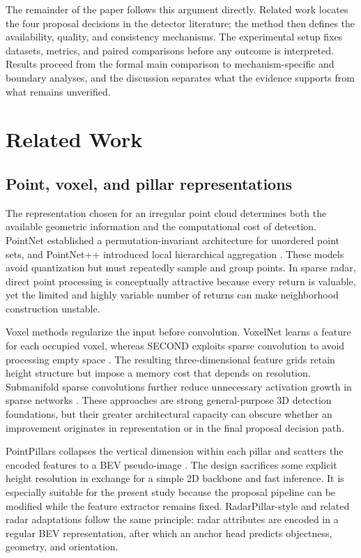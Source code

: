 \documentclass[final,5p,times]{elsarticle}
\begin{document}
The remainder of the paper follows this argument directly. Related work
locates the four proposal decisions in the detector literature; the method
then defines the availability, quality, and consistency mechanisms. The
experimental setup fixes datasets, metrics, and paired comparisons before any
outcome is interpreted. Results proceed from the formal main comparison to
mechanism-specific and boundary analyses, and the discussion separates what
the evidence supports from what remains unverified.

\section{Related Work}

\subsection{Point, voxel, and pillar representations}

The representation chosen for an irregular point cloud determines both the
available geometric information and the computational cost of detection.
PointNet established a permutation-invariant architecture for unordered point
sets, and PointNet++ introduced local hierarchical aggregation
\cite{qi2017pointnet,qi2017pointnetpp}. These models avoid quantization but
must repeatedly sample and group points. In sparse radar, direct point
processing is conceptually attractive because every return is valuable, yet
the limited and highly variable number of returns can make neighborhood
construction unstable.

Voxel methods regularize the input before convolution. VoxelNet learns a
feature for each occupied voxel, whereas SECOND exploits sparse convolution to
avoid processing empty space \cite{zhou2018voxelnet,yan2018second}. The
resulting three-dimensional feature grids retain height structure but impose a
memory cost that depends on resolution. Submanifold sparse convolutions further
reduce unnecessary activation growth in sparse networks
\cite{graham2018submanifold}. These approaches are strong general-purpose 3D
detection foundations, but their greater architectural capacity can obscure
whether an improvement originates in representation or in the final proposal
decision path.

PointPillars collapses the vertical dimension within each pillar and scatters
the encoded features to a BEV pseudo-image \cite{lang2019pointpillars}. The
design sacrifices some explicit height resolution in exchange for a simple 2D
backbone and fast inference. It is especially suitable for the present study
because the proposal pipeline can be modified while the feature extractor
remains fixed. RadarPillar-style and related radar adaptations follow the same
principle: radar attributes are encoded in a regular BEV representation, after
which an anchor head predicts objectness, geometry, and orientation.
\end{document}
